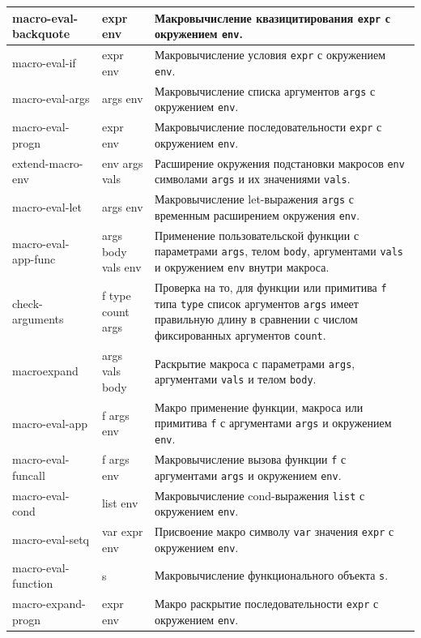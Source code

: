 \begin{xltabular}{\textwidth}{|p{2.5cm}|p{2.5cm}|X|}
	macro-eval-backquote & expr env & Макровычисление квазицитирования \texttt{expr} с окружением \texttt{env}. \\ \hline
	macro-eval-if & expr env & Макровычисление условия \texttt{expr} с окружением \texttt{env}. \\ \hline
	macro-eval-args & args env & Макровычисление списка аргументов \texttt{args} с окружением \texttt{env}. \\ \hline
	macro-eval-progn & expr env & Макровычисление последовательности \texttt{expr} с окружением \texttt{env}. \\ \hline
	extend-macro-env & env args vals & Расширение окружения подстановки макросов \texttt{env} символами \texttt{args} и их значениями \texttt{vals}. \\ \hline
	macro-eval-let & args env & Макровычисление let-выражения \texttt{args} с временным расширением окружения \texttt{env}. \\ \hline
	macro-eval-app-func & args body vals env & Применение пользовательской функции с параметрами \texttt{args}, телом \texttt{body}, аргументами \texttt{vals} и окружением \texttt{env} внутри макроса. \\ \hline
	check-arguments & f type count args & Проверка на то, для функции или примитива \texttt{f} типа \texttt{type} список аргументов \texttt{args} имеет правильную длину в сравнении с числом фиксированных аргументов \texttt{count}. \\ \hline
	macroexpand & args vals body & Раскрытие макроса с параметрами \texttt{args}, аргументами \texttt{vals} и телом \texttt{body}. \\ \hline
	macro-eval-app & f args env & Макро применение функции, макроса или примитива \texttt{f} с аргументами \texttt{args} и окружением \texttt{env}. \\ \hline
	macro-eval-funcall & f args env & Макровычисление вызова функции \texttt{f} с аргументами \texttt{args} и окружением \texttt{env}. \\ \hline
	macro-eval-cond & list env & Макровычисление cond-выражения \texttt{list} с окружением \texttt{env}. \\ \hline
	macro-eval-setq & var expr env & Присвоение макро символу \texttt{var} значения \texttt{expr} с окружением \texttt{env}. \\ \hline
	macro-eval-function & s & Макровычисление функционального объекта \texttt{s}. \\ \hline
	macro-expand-progn & expr env & Макро раскрытие последовательности \texttt{expr} с окружением \texttt{env}. \\ \hline
\end{xltabular}
\renewcommand{\arraystretch}{1.0} %


